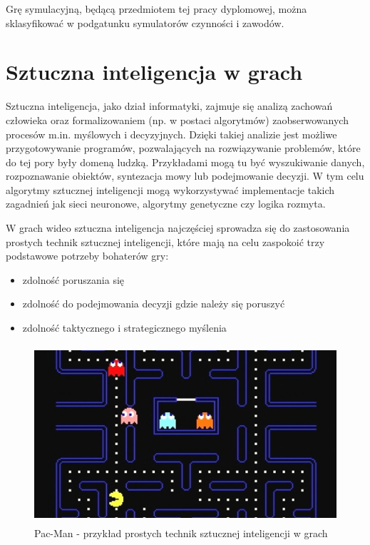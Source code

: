 Grę symulacyjną, będącą przedmiotem tej pracy dyplomowej, można sklasyfikować w podgatunku symulatorów czynności i zawodów.

\section{Sztuczna inteligencja w grach}\label{aiModelInfo}
Sztuczna inteligencja, jako dział informatyki, zajmuje się analizą zachowań człowieka oraz formalizowaniem (np. w postaci algorytmów) zaobserwowanych procesów m.in. myślowych i decyzyjnych. Dzięki takiej analizie jest możliwe przygotowywanie programów, pozwalających na rozwiązywanie problemów, które do tej pory były domeną ludzką. Przykładami mogą tu być wyszukiwanie danych, rozpoznawanie obiektów, syntezacja mowy lub podejmowanie decyzji. W tym celu algorytmy sztucznej inteligencji mogą wykorzystywać implementacje takich zagadnień jak sieci neuronowe, algorytmy genetyczne czy logika rozmyta.

W grach wideo sztuczna inteligencja najczęściej sprowadza się do zastosowania prostych technik sztucznej inteligencji, które mają na celu zaspokoić trzy podstawowe potrzeby bohaterów gry\cite{aiForGames}:
\begin{itemize}
	\item zdolność poruszania się 
	\item zdolność do podejmowania decyzji gdzie należy się poruszyć
	\item zdolność taktycznego i strategicznego myślenia
\end{itemize}

\begin{figure}
\begin{center}
	\includegraphics[width=120mm,height=66mm]{images/pacman}
	\caption{Pac-Man - przykład prostych technik sztucznej inteligencji w grach\label{pacman}}
\end{center}
\end{figure}

